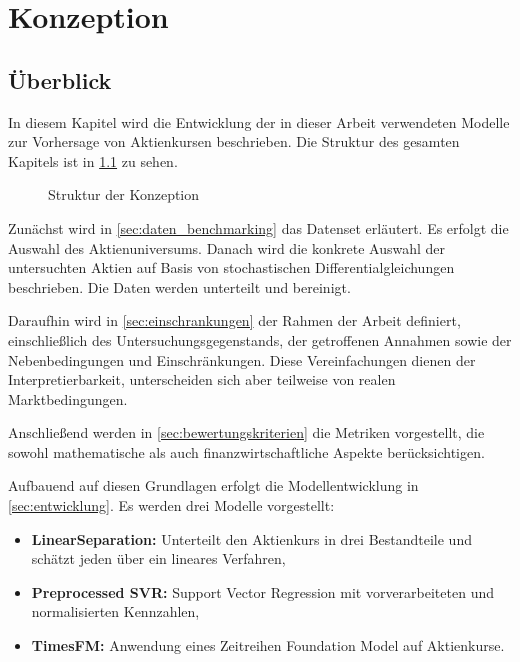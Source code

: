 \chapter{Konzeption}\label{chap:konzeption}
\section{Überblick}\label{sec:uberblick}
In diesem Kapitel wird die Entwicklung der in dieser Arbeit verwendeten Modelle zur Vorhersage von Aktienkursen beschrieben. Die Struktur des gesamten Kapitels ist in \cref{fig:ablauf} zu sehen.

\begin{figure}[htbp]
    \centering
    
    \caption{Struktur der Konzeption}\label{fig:ablauf}
\end{figure}

Zunächst wird in \cref{sec:daten_benchmarking} das Datenset erläutert. Es erfolgt die Auswahl des Aktienuniversums. Danach wird die konkrete Auswahl der untersuchten Aktien auf Basis von stochastischen Differentialgleichungen beschrieben. Die Daten werden unterteilt und bereinigt.

Daraufhin wird in \cref{sec:einschrankungen} der Rahmen der Arbeit definiert, einschließlich des Untersuchungsgegenstands, der getroffenen Annahmen sowie der Nebenbedingungen und Einschränkungen. Diese Vereinfachungen dienen der Interpretierbarkeit, unterscheiden sich aber teilweise von realen Marktbedingungen.

Anschließend werden in \cref{sec:bewertungskriterien} die Metriken vorgestellt, die sowohl mathematische als auch finanzwirtschaftliche Aspekte berücksichtigen.

Aufbauend auf diesen Grundlagen erfolgt die Modellentwicklung in \cref{sec:entwicklung}. Es werden drei Modelle vorgestellt:

\begin{itemize}
    \item \textbf{LinearSeparation:} Unterteilt den Aktienkurs in drei Bestandteile und schätzt jeden über ein lineares Verfahren,
    \item \textbf{Preprocessed SVR:} Support Vector Regression mit vorverarbeiteten und normalisierten Kennzahlen,
    \item \textbf{TimesFM:} Anwendung eines Zeitreihen Foundation Model auf Aktienkurse.
\end{itemize}

